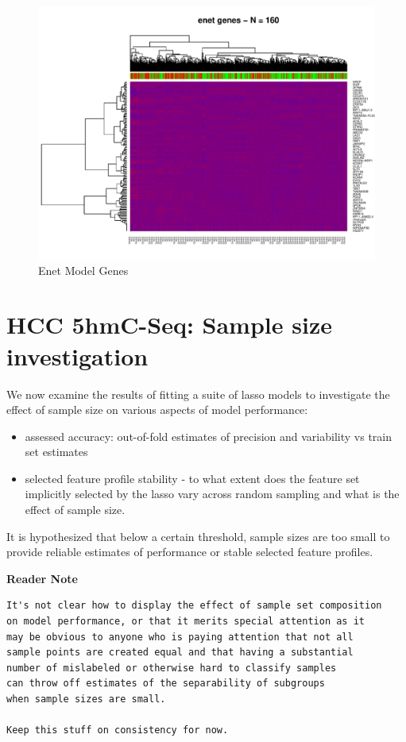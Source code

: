 \documentclass[
]{book}
\begin{document}
\begin{figure}
\centering
\includegraphics{Static/figures/hcc5hmC-glmnetFit-heatmapEnet-1.pdf}
\caption{\label{fig:hcc5hmC-glmnetFit-heatmapEnet}Enet Model Genes}
\end{figure}

\hypertarget{hcc-5hmcseq-model-suite}{%
\chapter{HCC 5hmC-Seq: Sample size investigation}\label{hcc-5hmcseq-model-suite}}

We now examine the results of fitting a suite of lasso models to
investigate the effect of sample size on
various aspects of model performance:

\begin{itemize}
\item
  assessed accuracy: out-of-fold estimates of precision and variability vs train set estimates
\item
  selected feature profile stability - to what extent does the
  feature set implicitly selected by the lasso vary across random
  sampling and what is the effect of sample size.
\end{itemize}

It is hypothesized that below a certain threshold,
sample sizes are too small to provide reliable estimates
of performance or stable selected feature profiles.

\textbf{Reader Note}

\begin{verbatim}
It's not clear how to display the effect of sample set composition
on model performance, or that it merits special attention as it
may be obvious to anyone who is paying attention that not all
sample points are created equal and that having a substantial
number of mislabeled or otherwise hard to classify samples
can throw off estimates of the separability of subgroups
when sample sizes are small.  

Keep this stuff on consistency for now.
\end{verbatim}
\end{document}
